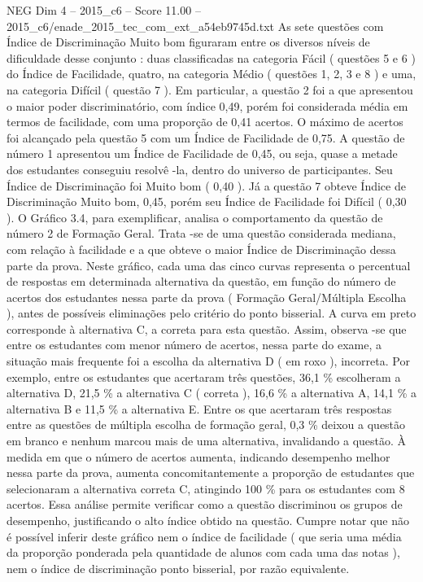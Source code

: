 \begin{textsample}{NEG Dim 4 – 2015\_c6 – Score 11.00 – 2015\_c6/enade\_2015\_tec\_com\_ext\_a54eb9745d.txt}
As sete questões com Índice de Discriminação Muito bom figuraram entre os diversos níveis de dificuldade desse conjunto : duas classificadas na categoria Fácil ( questões 5 e 6 ) do Índice de Facilidade, quatro, na categoria Médio ( questões 1, 2, 3 e 8 ) e uma, na categoria Difícil ( questão 7 ).
Em particular, a questão 2 foi a que apresentou o maior poder discriminatório, com índice 0,49, porém foi considerada média em termos de facilidade, com uma proporção de 0,41 acertos.
O máximo de acertos foi alcançado pela questão 5 com um Índice de Facilidade de 0,75.
A questão de número 1 apresentou um Índice de Facilidade de 0,45, ou seja, quase a metade dos estudantes conseguiu resolvê -la, dentro do universo de participantes.
Seu Índice de Discriminação foi Muito bom ( 0,40 ).
Já a questão 7 obteve Índice de Discriminação Muito bom, 0,45, porém seu Índice de Facilidade foi Difícil ( 0,30 ).
O Gráfico 3.4, para exemplificar, analisa o comportamento da questão de número 2 de Formação Geral.
Trata -se de uma questão considerada mediana, com relação à facilidade e a que obteve o maior Índice de Discriminação dessa parte da prova.
Neste gráfico, cada uma das cinco curvas representa o percentual de respostas em determinada alternativa da questão, em função do número de acertos dos estudantes nessa parte da prova ( Formação Geral/Múltipla Escolha ), antes de possíveis eliminações pelo critério do ponto bisserial.
A curva em preto corresponde à alternativa C, a correta para esta questão.
Assim, observa -se que entre os estudantes com menor número de acertos, nessa parte do exame, a situação mais frequente foi a escolha da alternativa D ( em roxo ), incorreta.
Por exemplo, entre os estudantes que acertaram três questões, 36,1 \% escolheram a alternativa D, 21,5 \% a alternativa C ( correta ), 16,6 \% a alternativa A, 14,1 \% a alternativa B e 11,5 \% a alternativa E.
Entre os que acertaram três respostas entre as questões de múltipla escolha de formação geral, 0,3 \% deixou a questão em branco e nenhum marcou mais de uma alternativa, invalidando a questão.
À medida em que o número de acertos aumenta, indicando desempenho melhor nessa parte da prova, aumenta concomitantemente a proporção de estudantes que selecionaram a alternativa correta C, atingindo 100 \% para os estudantes com 8 acertos.
Essa análise permite verificar como a questão discriminou os grupos de desempenho, justificando o alto índice obtido na questão.
Cumpre notar que não é possível inferir deste gráfico nem o índice de facilidade ( que seria uma média da proporção ponderada pela quantidade de alunos com cada uma das notas ), nem o índice de discriminação ponto bisserial, por razão equivalente.

\end{textsample}
